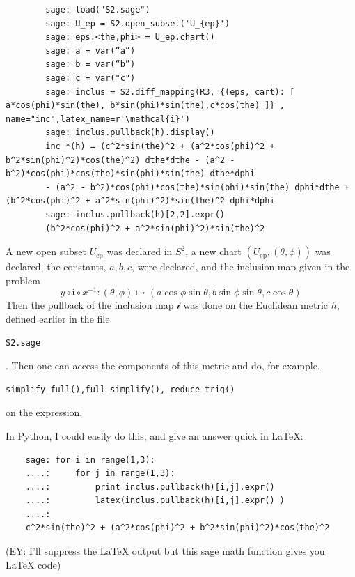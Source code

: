 \documentclass[10pt]{amsart}
\begin{document}
\begin{multicols*}{2}
	{\scriptsize \begin{verbatim}
		sage: load("S2.sage")
		sage: U_ep = S2.open_subset('U_{ep}')
		sage: eps.<the,phi> = U_ep.chart()
		sage: a = var(“a”)
		sage: b = var(“b”)
		sage: c = var("c")
		sage: inclus = S2.diff_mapping(R3, {(eps, cart): [ a*cos(phi)*sin(the), b*sin(phi)*sin(the),c*cos(the) ]} , name="inc",latex_name=r'\mathcal{i}')
		sage: inclus.pullback(h).display()
		inc_*(h) = (c^2*sin(the)^2 + (a^2*cos(phi)^2 + b^2*sin(phi)^2)*cos(the)^2) dthe*dthe - (a^2 - b^2)*cos(phi)*cos(the)*sin(phi)*sin(the) dthe*dphi 
		- (a^2 - b^2)*cos(phi)*cos(the)*sin(phi)*sin(the) dphi*dthe + (b^2*cos(phi)^2 + a^2*sin(phi)^2)*sin(the)^2 dphi*dphi
		sage: inclus.pullback(h)[2,2].expr()
		(b^2*cos(phi)^2 + a^2*sin(phi)^2)*sin(the)^2
		\end{verbatim}
	}
	A new open subset $U_{\text{ep}}$ was declared in $S^2$, a new chart $(U_{\text{ep}}, (\theta,\phi))$ was declared, the constants, $a,b,c$, were declared, and the inclusion map given in the problem
	\[
	y\circ \mathfrak{i} \circ x^{-1} : (\theta, \phi) \mapsto ( a\cos{\phi} \sin{\theta}, b \sin{\phi} \sin{\theta}, c\cos{\theta})
	\]
	Then the pullback of the inclusion map $\mathcal{i}$ was done on the Euclidean metric $h$, defined earlier in the file \begin{verbatim}S2.sage\end{verbatim}.  Then one can access the components of this metric and do, for example, \begin{verbatim}simplify_full(),full_simplify(), reduce_trig()\end{verbatim} on the expression.  
	
	In Python, I could easily do this, and give an answer quick in LaTeX:
	
	\begin{verbatim}
	sage: for i in range(1,3): 
	....:     for j in range(1,3):
	....:         print inclus.pullback(h)[i,j].expr()
	....:         latex(inclus.pullback(h)[i,j].expr() )
	....:         
	c^2*sin(the)^2 + (a^2*cos(phi)^2 + b^2*sin(phi)^2)*cos(the)^2
	\end{verbatim}
	(EY: I'll suppress the LaTeX output but this sage math function gives you LaTeX code)
	

\end{multicols*}
\end{document}
